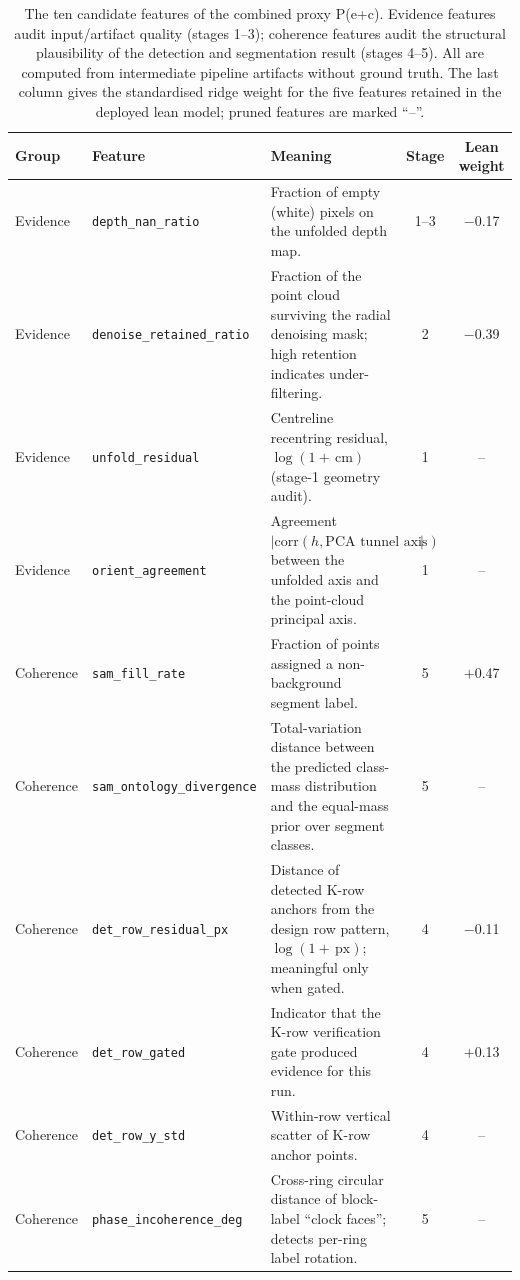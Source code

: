 \documentclass[a4paper,fleqn]{cas-dc}
\begin{document}
\begin{table}[t]
\caption{The ten candidate features of the combined proxy P(e+c). Evidence
features audit input/artifact quality (stages 1--3); coherence features audit
the structural plausibility of the detection and segmentation result
(stages 4--5). All are computed from intermediate pipeline artifacts without
ground truth. The last column gives the standardised ridge weight for the five
features retained in the deployed lean model; pruned features are marked
``--''.}\label{tab:candidate-features}
\begin{tabular*}{\textwidth}{@{\extracolsep{\fill}} l l p{} c c @{}}
\toprule
Group & Feature & Meaning & Stage & Lean weight \\
\midrule
Evidence & \texttt{depth\_nan\_ratio} & Fraction of empty (white) pixels on the unfolded depth map. & 1--3 & $-$0.17 \\
Evidence & \texttt{denoise\_retained\_ratio} & Fraction of the point cloud surviving the radial denoising mask; high retention indicates under-filtering. & 2 & $-$0.39 \\
Evidence & \texttt{unfold\_residual} & Centreline recentring residual, $\log(1{+}\,\mathrm{cm})$ (stage-1 geometry audit). & 1 & -- \\
Evidence & \texttt{orient\_agreement} & Agreement $\lvert\mathrm{corr}(h, \text{PCA tunnel axis})\rvert$ between the unfolded axis and the point-cloud principal axis. & 1 & -- \\
\midrule
Coherence & \texttt{sam\_fill\_rate} & Fraction of points assigned a non-background segment label. & 5 & $+$0.47 \\
Coherence & \texttt{sam\_ontology\_divergence} & Total-variation distance between the predicted class-mass distribution and the equal-mass prior over segment classes. & 5 & -- \\
Coherence & \texttt{det\_row\_residual\_px} & Distance of detected K-row anchors from the design row pattern, $\log(1{+}\,\mathrm{px})$; meaningful only when gated. & 4 & $-$0.11 \\
Coherence & \texttt{det\_row\_gated} & Indicator that the K-row verification gate produced evidence for this run. & 4 & $+$0.13 \\
Coherence & \texttt{det\_row\_y\_std} & Within-row vertical scatter of K-row anchor points. & 4 & -- \\
Coherence & \texttt{phase\_incoherence\_deg} & Cross-ring circular distance of block-label ``clock faces''; detects per-ring label rotation. & 5 & -- \\
\bottomrule
\end{tabular*}
\end{table}
\end{document}
